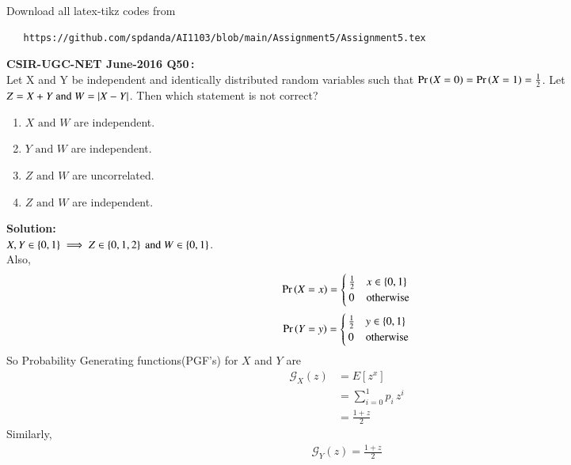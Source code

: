 \documentclass[journal,12pt,twocolumn]{IEEEtran}
\begin{document}
\maketitle
\newpage
\bigskip
\renewcommand{\thefigure}{\theenumi}
\renewcommand{\thetable}{\theenumi}
Download all latex-tikz codes from
\begin{lstlisting}
   https://github.com/spdanda/AI1103/blob/main/Assignment5/Assignment5.tex
\end{lstlisting}
\large\textbf{CSIR-UGC-NET June-2016 Q50\,:}\\
 Let X and Y be independent and identically distributed random variables such that \(\Pr\left(X=0\right)=\Pr\left(X=1\right)= \frac{1}{2}\). Let \(Z = X+Y \text{ and } W = \vert X-Y\vert\). Then which statement is not correct?
 \begin{enumerate}
     \item $X \text{ and } W$ are independent.
     \item $Y \text{ and } W$ are independent.
     \item $Z \text{ and } W$ are uncorrelated.
     \item $Z \text{ and } W$ are independent.
 \end{enumerate}
 \textbf{Solution:}\\
 $X, Y \in \left\{0,1\right\}\implies Z \in \left\{0,1,2\right\} \text{ and } W \in \left\{0,1\right\}$.\\
 Also,
 \begin{equation}
         \Pr\left(X=x\right) = 
     \begin{cases}
      \frac{1}{2} & x \in \left\{0,1\right\}\\
      0 & \text{otherwise}
     \end{cases}
 \end{equation}
  \begin{equation}
         \Pr\left(Y=y\right) = 
     \begin{cases}
      \frac{1}{2} & y \in \left\{0,1\right\}\\
      0 & \text{otherwise}
     \end{cases}
 \end{equation}
So Probability Generating functions(PGF's) for $X$ and $Y$ are
\begin{align}
    \mathcal{G}_{X}(z) &= E[z^x]\\
                       &= \sum_{i=0}^{1}p_i\,z^i\\
                       &=\frac{1+z}{2}
\end{align}
Similarly,
\begin{align}
    \mathcal{G}_{Y}(z) = \frac{1+z}{2}
\end{align}
\end{document}
